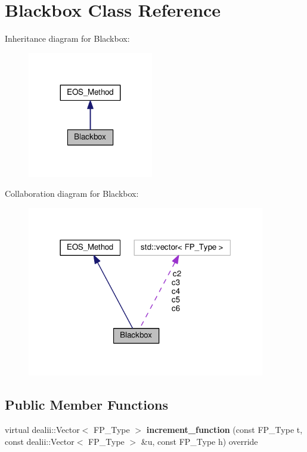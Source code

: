 \hypertarget{classBlackbox}{}\section{Blackbox Class Reference}
\label{classBlackbox}


Inheritance diagram for Blackbox\+:\nopagebreak
\begin{figure}[H]
\begin{center}
\leavevmode
\includegraphics[width=155pt]{classBlackbox__inherit__graph}
\end{center}
\end{figure}


Collaboration diagram for Blackbox\+:\nopagebreak
\begin{figure}[H]
\begin{center}
\leavevmode
\includegraphics[width=294pt]{classBlackbox__coll__graph}
\end{center}
\end{figure}
\subsection*{Public Member Functions}
\begin{DoxyCompactItemize}
\item 
\mbox{\label{classBlackbox_ab8925767242e15296cacb74a0b504711}} 
virtual dealii\+::\+Vector$<$ F\+P\+\_\+\+Type $>$ {\bfseries increment\+\_\+function} (const F\+P\+\_\+\+Type t, const dealii\+::\+Vector$<$ F\+P\+\_\+\+Type $>$ \&u, const F\+P\+\_\+\+Type h) override
\end{DoxyCompactItemize}
